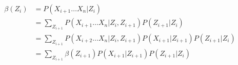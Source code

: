 \documentclass[11pt]{article}
\begin{document}
\begin{align*}
\beta(Z_i)
&= P(X_{i+1}\ldots X_n | Z_i)
\\&= \sum_{Z_{i+1}}P(X_{i+1}\ldots X_n | Z_i, Z_{i+1})P(Z_{i+1} | Z_i)
\\&= \sum_{Z_{i+1}}P(X_{i+2}\ldots X_n | Z_i, Z_{i+1})P(X_{i+1} | Z_{i+1})P(Z_{i+1} | Z_i)
\\&= \sum_{Z_{i+1}}\beta(Z_{i+1})P(X_{i+1} | Z_{i+1})P(Z_{i+1} | Z_i)
\end{align*}
\end{document}
